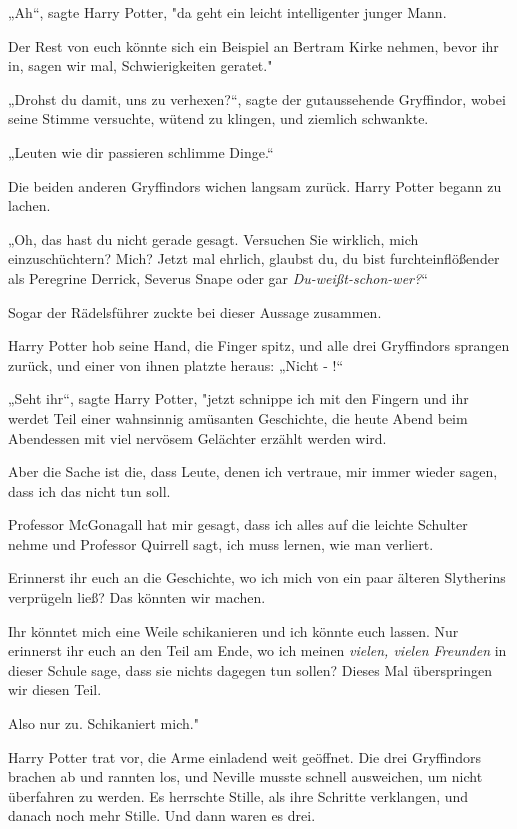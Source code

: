 {„Ah“, sagte Harry Potter, "da geht ein leicht intelligenter junger Mann.

Der Rest von euch könnte sich ein Beispiel an Bertram Kirke nehmen, bevor ihr in, sagen wir mal, Schwierigkeiten geratet."

„Drohst du damit, uns zu verhexen?“, sagte der gutaussehende Gryffindor, wobei seine Stimme versuchte, wütend zu klingen, und ziemlich schwankte.

„Leuten wie dir passieren schlimme Dinge.“

Die beiden anderen Gryffindors wichen langsam zurück. Harry Potter begann zu lachen.

„Oh, das hast du nicht gerade gesagt. Versuchen Sie wirklich, mich einzuschüchtern? Mich? Jetzt mal ehrlich, glaubst du, du bist furchteinflößender als Peregrine Derrick, Severus Snape oder gar \emph{Du-weißt-schon-wer?}“

Sogar der Rädelsführer zuckte bei dieser Aussage zusammen.

Harry Potter hob seine Hand, die Finger spitz, und alle drei Gryffindors sprangen zurück, und einer von ihnen platzte heraus: „Nicht - !“

„Seht ihr“, sagte Harry Potter, "jetzt schnippe ich mit den Fingern und ihr werdet Teil einer wahnsinnig amüsanten Geschichte, die heute Abend beim Abendessen mit viel nervösem Gelächter erzählt werden wird.

Aber die Sache ist die, dass Leute, denen ich vertraue, mir immer wieder sagen, dass ich das nicht tun soll.

Professor McGonagall hat mir gesagt, dass ich alles auf die leichte Schulter nehme und Professor Quirrell sagt, ich muss lernen, wie man verliert.

Erinnerst ihr euch an die Geschichte, wo ich mich von ein paar älteren Slytherins verprügeln ließ? Das könnten wir machen.

Ihr könntet mich eine Weile schikanieren und ich könnte euch lassen. Nur erinnerst ihr euch an den Teil am Ende, wo ich meinen \emph{vielen, vielen Freunden} in dieser Schule sage, dass sie nichts dagegen tun sollen? Dieses Mal überspringen wir diesen Teil.

Also nur zu. Schikaniert mich."

Harry Potter trat vor, die Arme einladend weit geöffnet. Die drei Gryffindors brachen ab und rannten los, und Neville musste schnell ausweichen, um nicht überfahren zu werden. Es herrschte Stille, als ihre Schritte verklangen, und danach noch mehr Stille. Und dann waren es drei.

}
